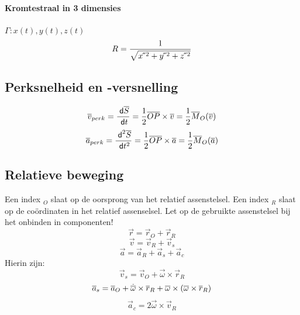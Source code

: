 \paragraph{Kromtestraal in 3 dimensies}
\label{sec:Kromtestraal3D}
$\Gamma : x\left(t\right), y\left(t\right), z\left(t\right)$
\[
  R = \frac{1}{\sqrt{x \acute{}\, \acute{}\,^2 + y \acute{}\, \acute{}\,^2 + z \acute{}\, \acute{}\,^2}}
\]

\subsection{Perksnelheid en -versnelling}
\label{sec:Perksnelheid}
\[
  \overline{v}_{perk} = \frac{\;\textsf{d}\overline{S}}{\;\textsf{d}t} = \frac{1}{2} \overline{OP} \times \overline{v} = \frac{1}{2} \overline{M}_O (\overline{v})
\]
\[
  \overline{a}_{perk} = \frac{\;\textsf{d}^2{\overline{S}}}{\;\textsf{d}t^2} = \frac{1}{2} \overline{OP} \times \overline{a} = \frac{1}{2} \overline{M}_O (\overline{a})
\]

\subsection{Relatieve beweging}
Een index $_O$ slaat op de oorsprong van het relatief assenstelsel.
Een index $_R$ slaat op de coördinaten in het relatief assenselsel.
Let op de gebruikte assenstelsel bij het onbinden in componenten!
\[
  \vec{r} = \vec{r}_O + \vec{r}_R
\]
\[
  \vec{v} = \vec{v}_R + \vec{v}_s
\]
\[
  \vec{a} = \vec{a}_R + \vec{a}_s + \vec{a}_c
\]
Hierin zijn:
\[
  \vec{v}_s = \vec{v}_O + \vec{\omega} \times \vec{r}_R
\]
\[
  \overline{a}_s = \overline{a}_O + \dot{\overline{\omega}} \times \overline{r}_R + \overline{\omega} \times \left( \overline{\omega} \times \overline{r}_R \right)
\]
\[
  \vec{a}_c = 2 \vec{\omega} \times \vec{v}_R
\]



